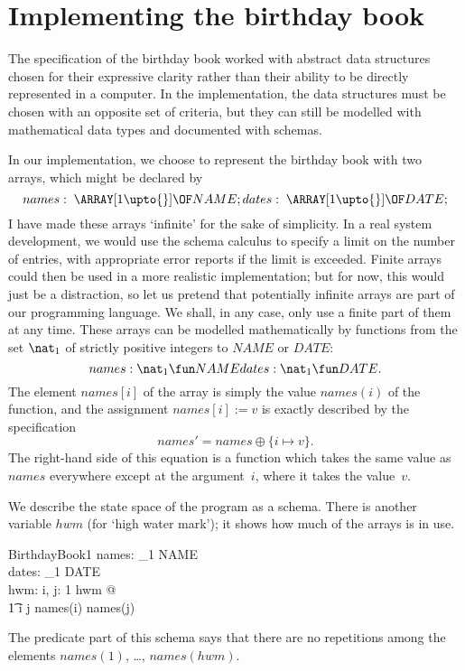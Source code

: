 \section{Implementing the birthday book}

The specification of the birthday book worked with abstract data structures
chosen for their expressive clarity rather than their ability to be directly
represented in a computer. In the implementation, the data structures must
be chosen with an opposite set of criteria, but they can still be modelled
with mathematical data types and documented with schemas.

In our implementation, we choose to represent the birthday book with two
arrays, which might be declared by
\[
	names:\;\ARRAY [1\upto{}] \OF NAME; \\
	dates:\;\ARRAY [1\upto{}] \OF DATE;
\]
I have made these arrays `infinite' for the sake of simplicity. In
a real system development, we would use the schema calculus to specify
a limit on the number of entries, with appropriate error reports if
the limit is exceeded. Finite arrays could then be used in a more
realistic implementation; but for now, this would just be a distraction,
so let us pretend that potentially infinite arrays are part of our
programming language. We shall, in any case, only use a finite part of
them at any time.
These arrays can be modelled mathematically by functions from the set
$\nat_1$ of strictly positive integers to $NAME$ or $DATE$:
\[
	names: \nat_1 \fun NAME \\
	dates: \nat_1 \fun DATE.
\]
The element $names[i]$ of the array is simply the value $names(i)$ of
the function, and the assignment
$names[i] := v$
is exactly described by the specification
\[ names' = names \oplus \{i \mapsto v\}. \]
The right-hand side of this equation is a function which takes the
same value as $names$ everywhere except at the argument~$i$, where it
takes the value~$v$.

We describe the state space of the program as a schema. There is
another variable $hwm$ (for `high water mark'); it shows how much of
the arrays is in use.
\begin{schema}{BirthdayBook1}
	names: \nat_1 \fun NAME \\
	dates: \nat_1 \fun DATE \\
	hwm: \nat
\where
	\forall i, j: 1 \upto hwm @ \\
\t1		i \neq j \implies names(i) \neq names(j)
\end{schema}
The predicate part of this schema says that there are no repetitions
among the elements $names(1)$, \dots, $names(hwm)$.

